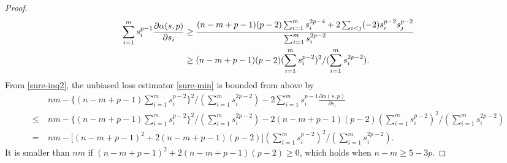 \documentclass[11pt, a4paper]{article}
\theoremstyle{remark}
\begin{document}
\begin{proof}
\begin{align}
    \sum_{i=1}^m s_i^{p-1}\frac{\partial\alpha( s,p)}{\partial s_i}&\ge\frac{(n-m+p-1)(p-2)\sum_{i=1}^m s_i^{2p-4}+2\sum_{i<j}(-2) s_i^{p-2} s_j^{p-2}}{\sum_{i=1}^m s_i^{2p-2}}\notag\\
    &\ge (n-m+p-1)(p-2)(\sum_{i=1}^m s_i^{p-2})^2/(\sum_{i=1}^m s_i^{2p-2}). \label{sure-inq2}
    \end{align}
From \eqref{sure-inq2}, the unbiased loss estimator \eqref{sure-min} is bounded from above by
\begin{align*}
   &nm-\Big\{(n-m+p-1)\sum_{i=1}^m s_i^{p-2}\Big\}^2/(\sum_{i=1}^m s_i^{2p-2})-2\sum_{i=1}^m s_i^{p-1}\frac{\partial\alpha( s,p)}{\partial s_i} \\
   \le\ & nm-\Big\{(n-m+p-1)\sum_{i=1}^m s_i^{p-2}\Big\}^2/(\sum_{i=1}^m s_i^{2p-2})-2(n-m+p-1)(p-2)(\sum_{i=1}^m s_i^{p-2})^2/(\sum_{i=1}^m s_i^{2p-2}) \\
   =\ & nm-\big[(n-m+p-1)^2+2(n-m+p-1)(p-2)\big](\sum_{i=1}^m s_i^{p-2})^2/(\sum_{i=1}^m s_i^{2p-2}).
\end{align*} 
It is smaller than $nm$ if $(n-m+p-1)^2+2(n-m+p-1)(p-2)\ge0$, which holds when $n-m\ge 5-3p$.


\end{proof}
\end{document}
